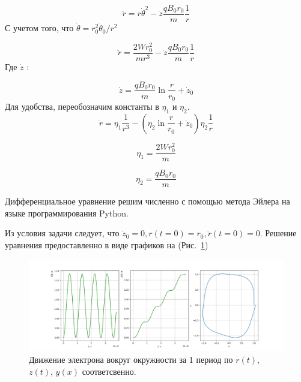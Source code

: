 \begin{equation}
    \ddot{r} = r \dot{\theta}^2 - \dot{z} \frac{qB_0 r_0}{m} \frac{1}{r}   
\end{equation}
С учетом того, что $ \dot{\theta} = r_0^2 \dot{\theta}_0 / r^2 $ %

\begin{equation}
    \ddot{r} = \frac{2W r^2_0}{m r^3} - \dot{z} \frac{qB_0 r_0}{m} \frac{1}{r}    
\end{equation}
Где $ \dot{z} $ :

\begin{equation}
    \dot{z} = \frac{q B_0 r_0}{m} \ln{\frac{r}{r_0}} + \dot{z}_0 \label{dotz}
\end{equation}
Для удобства, переобозначим константы в $\eta_1$ и $\eta_2$.
\begin{equation}
    \ddot{r} =\eta_1 \frac{1}{r^3} - \left(\eta_2\ln{\frac{r}{r_0}} + \dot{z}_0 \right) \eta_2 \frac{1}{r} \label{eq4}
\end{equation}

\begin{equation}
    \eta_1 = \frac{2W r_0^2}{m}
\end{equation}

\begin{equation}
    \eta_2 = \frac{qB_0 r_0}{m}
\end{equation}


Дифференциальное уравнение решим численно с помощью метода Эйлера на языке программирования Python. \par
Из условия задачи следует, что $\dot{z}_0 = 0, r(t=0) = r_0, \dot{r}(t=0) = 0$. Решение уравнения предоставленно в виде графиков на (Рис.~\ref{fig:1}) 
\newpage
\begin{figure}[h]
    \centering
    \includegraphics[width=1\linewidth]{../prog/Figure_1.png}\caption{Движение электрона вокруг окружности за 1 период по $r(t)$, $z(t)$, $y(x)$ соответсвенно.}\label{fig:1}
\end{figure}


